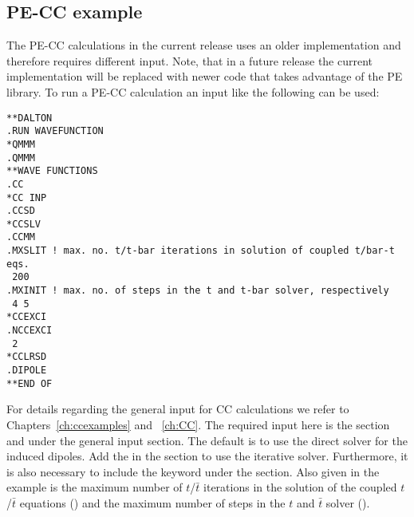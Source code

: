 \subsection*{PE-CC example}\label{sec:pecc}
The PE-CC calculations in the current release uses an older implementation and
therefore requires different input. Note, that in a future release the current
implementation will be replaced with newer code that takes advantage of the
PE library. To run a PE-CC calculation an input like the following can be
used:
\begin{verbatim}
**DALTON
.RUN WAVEFUNCTION
*QMMM
.QMMM
**WAVE FUNCTIONS
.CC
*CC INP
.CCSD
*CCSLV
.CCMM
.MXSLIT ! max. no. t/t-bar iterations in solution of coupled t/bar-t eqs.
 200
.MXINIT ! max. no. of steps in the t and t-bar solver, respectively
 4 5
*CCEXCI
.NCCEXCI
 2
*CCLRSD
.DIPOLE
**END OF
\end{verbatim}
For details regarding the general input for CC calculations we refer to
Chapters~\ref{ch:ccexamples} and ~\ref{ch:CC}. The required input here is the
 section and  under the general  input
section. The default is to use the direct solver for the induced dipoles. Add
the  in the  section to use the iterative solver.
Furthermore, it is also necessary to include the  keyword under the
 section. Also given in the example is the maximum number of
$t$/$\bar{t}$ iterations in the solution of the coupled $t$/$\bar{t}$
equations () and the maximum number of steps in the $t$ and
$\bar{t}$ solver ().

